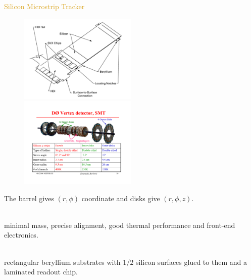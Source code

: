 \begin{frame}{\textcolor{Goldenrod}{Silicon Microstrip Tracker}}
  \begin{overlayarea}{\textwidth}{\textheight}
    \begin{figure}[h]\centering
      \includegraphics[height=0.3\textheight,width=0.5\textwidth]{./Images/09_SMT_03}
      \includegraphics[height=0.3\textheight,width=0.5\textwidth]{./Images/09_SMT}
    \end{figure}
    
    \itt[<+->]
  \item The barrel gives $(r, \phi)$ coordinate and disks give $(r,
    \phi, z)$.
  \item {}\\ minimal mass, precise
    alignment, good thermal performance and front-end electronics.
  \item {}\\ rectangular beryllium substrates with $1/2$
    silicon surfaces glued to them and a laminated readout chip.
    \tti
\end{overlayarea}
\end{frame}
